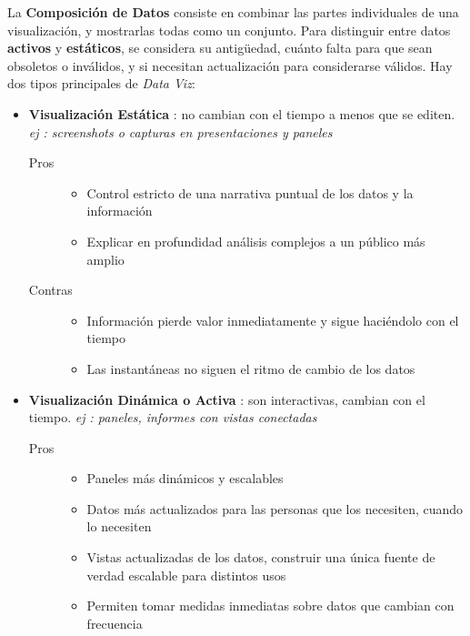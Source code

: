 La \textbf{Composición de Datos} consiste en combinar las partes individuales de una visualización, y mostrarlas todas como un conjunto. Para distinguir entre datos \textbf{activos} y \textbf{estáticos}, se considera su antigüedad, cuánto falta para que sean obsoletos o inválidos, y si necesitan actualización para considerarse válidos. Hay dos tipos principales de \textit{Data Viz}:
\begin{itemize}
    \item {\textbf{Visualización Estática} : no cambian con el tiempo a menos que se editen. \textit{ej : screenshots o capturas en presentaciones y paneles}
    \begin{description}
        \item [Pros]{ 
        \begin{itemize}
            \item {Control estricto de una narrativa puntual de los datos y la información}
            \item {Explicar en profundidad análisis complejos a un público más amplio}
        \end{itemize}}
        \item [Contras]{ 
        \begin{itemize}
            \item {Información pierde valor inmediatamente y sigue haciéndolo con el tiempo}
            \item {Las instantáneas no siguen el ritmo de cambio de los datos}
        \end{itemize}}
    \end{description}}
    \item {\textbf{Visualización Dinámica o Activa} : son interactivas, cambian con el tiempo. \textit{ej : paneles, informes con vistas conectadas}
    \begin{description}
        \item[Pros]{
        \begin{itemize}
            \item {Paneles más dinámicos y escalables}
            \item {Datos más actualizados para las personas que los necesiten, cuando lo necesiten}
            \item {Vistas actualizadas de los datos, construir una única fuente de verdad escalable para distintos usos}
            \item {Permiten tomar medidas inmediatas sobre datos que cambian con frecuencia}

\end{itemize}}
\end{description}}
\end{itemize}
